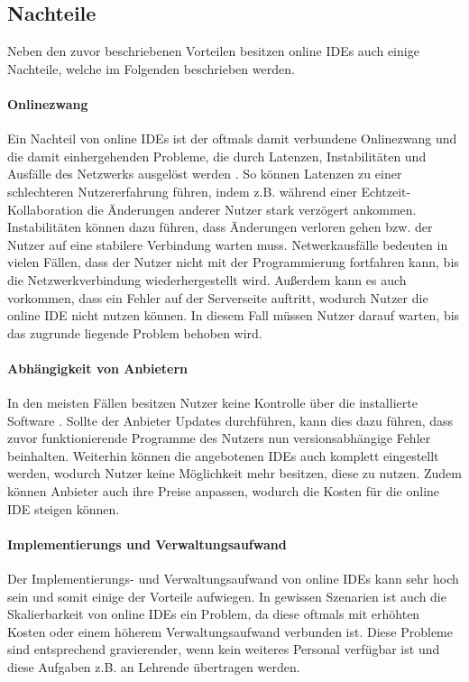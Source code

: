 \subsection{Nachteile}\label{section:stand-der-technik:literaturrecherche:nachteile}

Neben den zuvor beschriebenen Vorteilen besitzen online IDEs auch einige Nachteile, welche im Folgenden beschrieben werden.

\paragraph{Onlinezwang}
Ein Nachteil von online IDEs ist der oftmals damit verbundene Onlinezwang und die damit einhergehenden Probleme, die durch Latenzen, Instabilitäten und Ausfälle des Netzwerks ausgelöst werden \cite{kats_software_2012}\cite{leisner_good-bye_2019}. So können Latenzen zu einer schlechteren Nutzererfahrung führen, indem z.B. während einer Echtzeit-Kollaboration die Änderungen anderer Nutzer stark verzögert ankommen. Instabilitäten können dazu führen, dass Änderungen verloren gehen bzw. der Nutzer auf eine stabilere Verbindung warten muss. Netwerkausfälle bedeuten in vielen Fällen, dass der Nutzer nicht mit der Programmierung fortfahren kann, bis die Netzwerkverbindung wiederhergestellt wird. Außerdem kann es auch vorkommen, dass ein Fehler auf der Serverseite auftritt, wodurch Nutzer die online IDE nicht nutzen können. In diesem Fall müssen Nutzer darauf warten, bis das zugrunde liegende Problem behoben wird.

\paragraph{Abhängigkeit von Anbietern}
In den meisten Fällen besitzen Nutzer keine Kontrolle über die installierte Software \cite{kats_software_2012}. Sollte der Anbieter Updates durchführen, kann dies dazu führen, dass zuvor funktionierende Programme des Nutzers nun versionsabhängige Fehler beinhalten. Weiterhin können die angebotenen IDEs auch komplett eingestellt werden, wodurch Nutzer keine Möglichkeit mehr besitzen, diese zu nutzen. Zudem können Anbieter auch ihre Preise anpassen, wodurch die Kosten für die online IDE steigen können.

\paragraph{Implementierungs und Verwaltungsaufwand}
Der Implementierungs- und Verwaltungsaufwand von online IDEs kann sehr hoch sein \cite{malan_standardizing_2022} und somit einige der Vorteile aufwiegen. In gewissen Szenarien ist auch die Skalierbarkeit von online IDEs ein Problem, da diese oftmals mit erhöhten Kosten oder einem höherem Verwaltungsaufwand verbunden ist. Diese Probleme sind entsprechend gravierender, wenn kein weiteres Personal verfügbar ist und diese Aufgaben z.B. an Lehrende übertragen werden.

